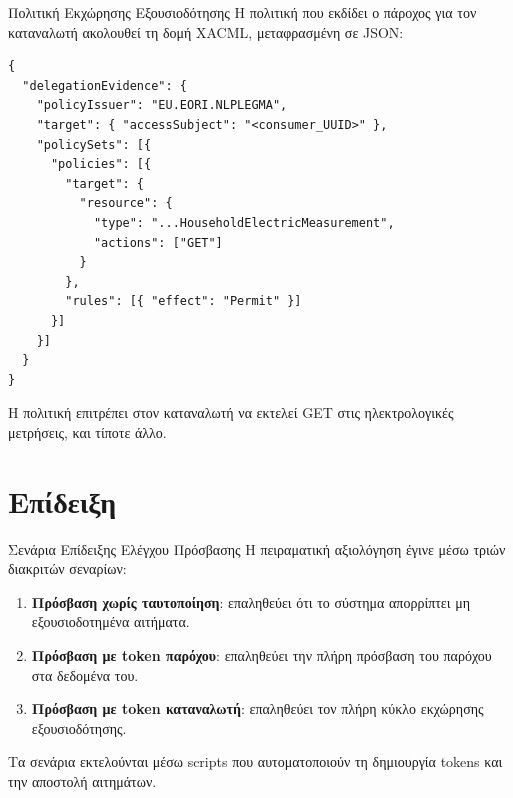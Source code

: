 \documentclass[11pt]{beamer}
\newcommand{\en}[1]{\foreignlanguage{english}{#1}}
\begin{document}
\begin{frame}[fragile]{Πολιτική Εκχώρησης Εξουσιοδότησης}
Η πολιτική που εκδίδει ο πάροχος για τον καταναλωτή ακολουθεί τη
δομή \en{XACML}, μεταφρασμένη σε \en{JSON}:

\begin{lstlisting}
{
  "delegationEvidence": {
    "policyIssuer": "EU.EORI.NLPLEGMA",
    "target": { "accessSubject": "<consumer_UUID>" },
    "policySets": [{
      "policies": [{
        "target": {
          "resource": {
            "type": "...HouseholdElectricMeasurement",
            "actions": ["GET"]
          }
        },
        "rules": [{ "effect": "Permit" }]
      }]
    }]
  }
}
\end{lstlisting}

Η πολιτική επιτρέπει στον καταναλωτή να εκτελεί \textlatin{GET} στις
ηλεκτρολογικές μετρήσεις, και τίποτε άλλο.
\end{frame}

\section{Επίδειξη}

\begin{frame}{Σενάρια Επίδειξης Ελέγχου Πρόσβασης}
Η πειραματική αξιολόγηση έγινε μέσω τριών διακριτών σεναρίων:
\bigskip
\begin{enumerate}
    \item \textbf{Πρόσβαση χωρίς ταυτοποίηση}: επαληθεύει ότι το
    σύστημα απορρίπτει μη εξουσιοδοτημένα αιτήματα.
    \item \textbf{Πρόσβαση με \en{token} παρόχου}: επαληθεύει
    την πλήρη πρόσβαση του παρόχου στα δεδομένα του.
    \item \textbf{Πρόσβαση με \en{token} καταναλωτή}: επαληθεύει
    τον πλήρη κύκλο εκχώρησης εξουσιοδότησης.
\end{enumerate}
\bigskip
Τα σενάρια εκτελούνται μέσω \en{scripts} που αυτοματοποιούν τη δημιουργία \en{tokens} και την αποστολή αιτημάτων.
\end{frame}
\end{document}
